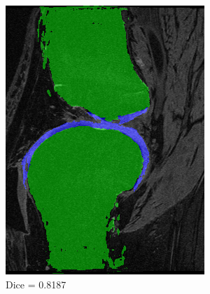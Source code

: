 \documentclass[a4paper,12pt]{article}
\begin{document}
\begin{figure}[H]
\begin{subfigure}[b]{0.32\linewidth}
    \includegraphics[width=\linewidth]{final_SRC_median.png}
    \caption{Dice = 0.8187}
    \end{subfigure}
    \begin{subfigure}[b]{0.32\linewidth}

\end{subfigure}
\end{figure}
\end{document}

